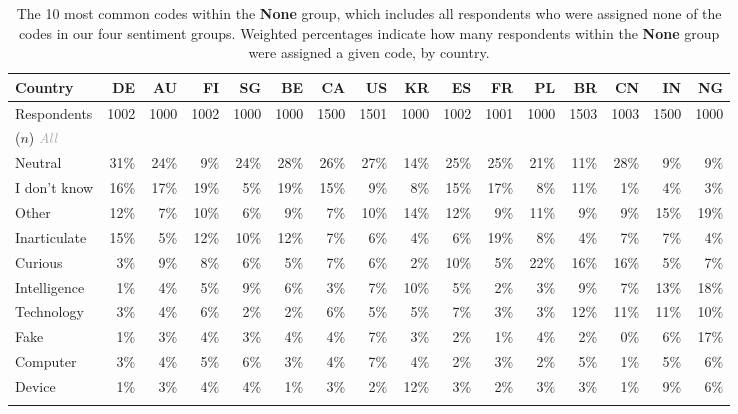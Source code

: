 \documentclass[11pt]{article} %
\newcommand\gray[1]{\textcolor{darkgray}{#1}}
\def\None/{{\fontfamily{lmss}\selectfont\textbf{None}}}
\begin{document}
\begin{table}\centering
\footnotesize
\begin{tabular}{@{}l rrrrr rrrrr rrrrr @{}}

Country	&	\bf DE	&	\bf AU	&	\bf FI	&	\bf SG	&	\bf BE	&	\bf CA	&	\bf US	&	\bf KR	&	\bf ES	&	\bf FR	&	\bf PL	&	\bf BR	&	\bf CN	&	\bf IN	&	\bf NG		\\
	
	\midrule
												
Respondents 	&	1002	&	1000	&	1002	&	1000	&	1000	&	1500	&	1501	&	1000	&	1002	&	1001	&	1000	&	1503	&	1003	&	1500	&	1000				\\
	($n$) \gray{\emph{All}} \\
	\midrule
													
Neutral	&	31\%	&	24\%	&	9\%	&	24\%	&	28\%	&	26\%	&	27\%	&	14\%	&	25\%	&	25\%	&	21\%	&	11\%	&	28\%	&	9\%	&	9\%	\\
I don't know 	&	16\%	&	17\%	&	19\%	&	5\%	&	19\%	&	15\%	&	9\%	&	8\%	&	15\%	&	17\%	&	8\%	&	11\%	&	1\%	&	4\%	&	3\%	\\
Other	&	12\%	&	7\%	&	10\%	&	6\%	&	9\%	&	7\%	&	10\%	&	14\%	&	12\%	&	9\%	&	11\%	&	9\%	&	9\%	&	15\%	&	19\%	\\
Inarticulate	&	15\%	&	5\%	&	12\%	&	10\%	&	12\%	&	7\%	&	6\%	&	4\%	&	6\%	&	19\%	&	8\%	&	4\%	&	7\%	&	7\%	&	4\%	\\
Curious	&	3\%	&	9\%	&	8\%	&	6\%	&	5\%	&	7\%	&	6\%	&	2\%	&	10\%	&	5\%	&	22\%	&	16\%	&	16\%	&	5\%	&	7\%	\\
Intelligence	&	1\%	&	4\%	&	5\%	&	9\%	&	6\%	&	3\%	&	7\%	&	10\%	&	5\%	&	2\%	&	3\%	&	9\%	&	7\%	&	13\%	&	18\%	\\
Technology	&	3\%	&	4\%	&	6\%	&	2\%	&	2\%	&	6\%	&	5\%	&	5\%	&	7\%	&	3\%	&	3\%	&	12\%	&	11\%	&	11\%	&	10\%	\\
Fake	&	1\%	&	3\%	&	4\%	&	3\%	&	4\%	&	4\%	&	7\%	&	3\%	&	2\%	&	1\%	&	4\%	&	2\%	&	0\%	&	6\%	&	17\%	\\
Computer	&	3\%	&	4\%	&	5\%	&	6\%	&	3\%	&	4\%	&	7\%	&	4\%	&	2\%	&	3\%	&	2\%	&	5\%	&	1\%	&	5\%	&	6\%	\\
Device	&	1\%	&	3\%	&	4\%	&	4\%	&	1\%	&	3\%	&	2\%	&	12\%	&	3\%	&	2\%	&	3\%	&	3\%	&	1\%	&	9\%	&	6\%	\\

\bottomrule
\vspace{0.01cm}
\end{tabular}

\caption{ The 10 most common codes within the \None/ group, which includes all respondents who were assigned none of the codes in our four sentiment groups. Weighted percentages indicate how many respondents within the \None/ group were assigned a given code, by country. }
\label{tab:nones}

\end{table}
\end{document}
